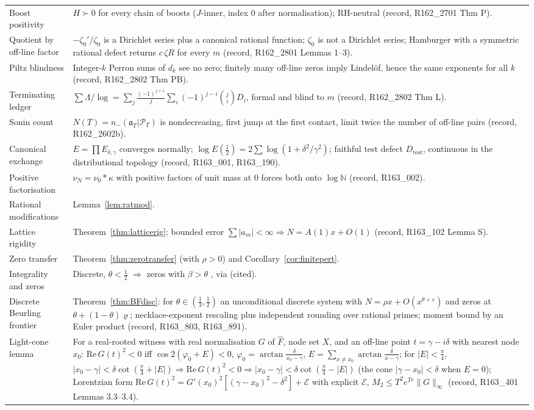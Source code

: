 \documentclass[11pt]{amsart}
\theoremstyle{definition}
\theoremstyle{remark}
\newcommand{\N}{\mathbb N}
\newcommand{\PT}{\mathcal P_T}
\begin{document}
\begin{longtable}{@{}p{4.2cm}p{10.3cm}@{}}
Boost positivity & $H\succ0$ for every chain of boosts ($J$-inner, index $0$ after normalisation); RH-neutral (record, R162\_2701 Thm P). \\
Quotient by off-line factor & $-\zeta_0'/\zeta_0$ is a Dirichlet series plus a canonical rational function; $\zeta_0$ is not a Dirichlet series; Hamburger with a symmetric rational defect returns $c\,\zeta R$ for every $m$ (record, R162\_2801 Lemmas 1--3). \\
Piltz blindness & Integer-$k$ Perron sums of $d_k$ see no zero; finitely many off-line zeros imply Lindel\"of, hence the same exponents for all $k$ (record, R162\_2802 Thm PB). \\
Terminating ledger & $\sum\Lambda/\log=\sum_j\frac{(-1)^{j+1}}j\sum_i(-1)^{j-i}\binom jiD_i$, formal and blind to $m$ (record, R162\_2802 Thm L). \\
Sonin count & $N(T)=n_-(\mathfrak a_T|\PT)$ is nondecreasing, first jump at the first contact, limit twice the number of off-line pairs (record, R162\_2602b). \\
Canonical exchange & $E=\prod E_{\delta,\gamma}$ converges normally; $\log E(\frac12)=2\sum\log(1+\delta^2/\gamma^2)$; faithful test defect $D_{\mathrm{test}}$, continuous in the distributional topology (record, R163\_001, R163\_190). \\
Positive factorisation & $\nu_N=\nu_0*\kappa$ with positive factors of unit mass at $0$ forces both onto $\log\N$ (record, R163\_002). \\
Rational modifications & Lemma~\ref{lem:ratmod}. \\
Lattice rigidity & Theorem~\ref{thm:latticerig}; bounded error $\sum|a_m|<\infty\Rightarrow N=A(1)x+O(1)$ (record, R163\_102 Lemma S). \\
Zero transfer & Theorem~\ref{thm:zerotransfer} (with $\rho>0$) and Corollary~\ref{cor:finitepert}. \\
Integrality and zeros & Discrete, $\theta<\frac12$ $\Rightarrow$ zeros with $\beta>\theta$ \cite[Rem.~7]{Revesz2023}, via \cite{Hilberdink2010} (cited). \\
Discrete Beurling frontier & Theorem~\ref{thm:BFdisc}: for $\theta\in(\frac13,\frac12)$ an unconditional discrete system with $N=\rho x+O(x^{\theta+\varepsilon})$ and zeros at $\theta+(1-\theta)\varrho$; necklace-exponent rescaling plus independent rounding over rational primes; moment bound by an Euler product (record, R163\_803, R163\_891). \\
Light-cone lemma & For a real-rooted witness with real normalisation $G$ of $\widehat F$, node set $X$, and an off-line point $t=\gamma-i\delta$ with nearest node $x_0$: $\mathrm{Re}\,G(t)^2<0$ iff $\cos2(\varphi_0+E)<0$, $\varphi_0=\arctan\frac{\delta}{x_0-\gamma}$, $E=\sum_{x\ne x_0}\arctan\frac{\delta}{x-\gamma}$; for $|E|<\frac\pi4$, $|x_0-\gamma|<\delta\cot(\frac\pi4+|E|)\Rightarrow\mathrm{Re}\,G(t)^2<0\Rightarrow|x_0-\gamma|<\delta\cot(\frac\pi4-|E|)$ (the cone $|\gamma-x_0|<\delta$ when $E=0$); Lorentzian form $\mathrm{Re}\,G(t)^2=G'(x_0)^2[(\gamma-x_0)^2-\delta^2]+\mathcal E$ with explicit $\mathcal E$, $M_2\le T^2e^{Tr}\|G\|_\infty$ (record, R163\_401 Lemmas 3.3--3.4). \\

\end{longtable}
\end{document}
